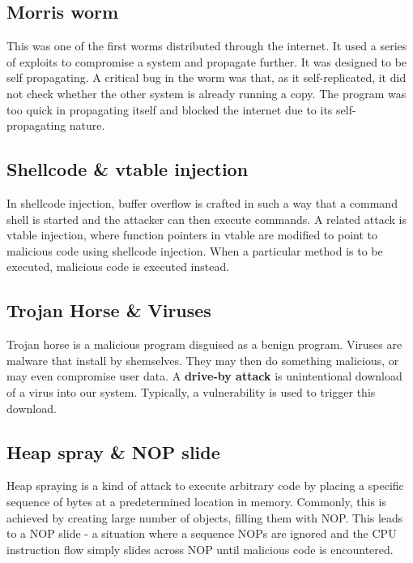 \documentclass[twoside]{article}
\begin{document}
\subsection{Morris worm}
This was one of the first worms distributed through the internet. It used a series of exploits to compromise a system and propagate further. It was designed to be self propagating. A critical bug in the worm was that, as it self-replicated, it did not check whether the other system is already running a copy. The program was too quick in propagating itself and blocked the internet due to its self-propagating nature.

\subsection{Shellcode \& vtable injection }
In shellcode injection, buffer overflow is crafted in such a way that a command shell is started and the attacker can then execute commands. A related attack is vtable injection, where function pointers in vtable are modified to point to malicious code using shellcode injection. When a particular method is to be executed, malicious code is executed instead.

\subsection{Trojan Horse \& Viruses}
Trojan horse is a malicious program disguised as a benign program. Viruses are malware that install by shemselves. They may then do something malicious, or may even compromise user data. A \textbf{drive-by attack} is unintentional download of a virus into our system. Typically, a vulnerability is used to trigger this download. 

\subsection{Heap spray \& NOP slide}
Heap spraying is a kind of attack to execute arbitrary code by placing a specific sequence of bytes at a predetermined location in memory. Commonly, this is achieved by creating large number of objects, filling them with NOP. This leads to a NOP slide - a situation where a sequence NOPs are ignored and the CPU instruction flow simply slides across NOP until malicious code is encountered.
\end{document}
